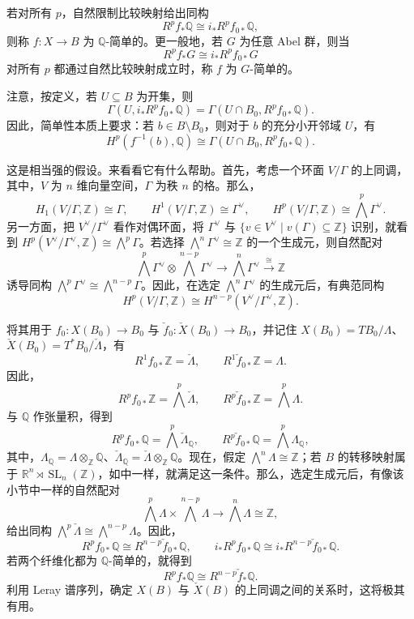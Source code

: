 \begin{definition}\label{def:6.101}
若对所有 $p$，自然限制比较映射给出同构
\[
R^pf_*\mathbb Q\cong i_*R^pf_{0*}\mathbb Q,
\]
则称 $f\colon X\to B$ 为 $\mathbb Q$-简单的。更一般地，若 $G$ 为任意 Abel 群，则当
\[
R^pf_*G\cong i_*R^pf_{0*}G
\]
对所有 $p$ 都通过自然比较映射成立时，称 $f$ 为 $G$-简单的。
\end{definition}

注意，按定义，若 $U\subseteq B$ 为开集，则
\[
\Gamma(U,i_*R^pf_{0*}\mathbb Q)
=\Gamma(U\cap B_0,R^pf_{0*}\mathbb Q).
\]
因此，简单性本质上要求：若 $b\in B\setminus B_0$，则对于 $b$ 的充分小开邻域 $U$，有
\[
H^p(f^{-1}(b),\mathbb Q)
\cong\Gamma(U\cap B_0,R^pf_{0*}\mathbb Q).
\]

这是相当强的假设。来看看它有什么帮助。首先，考虑一个环面 $V/\Gamma$ 的上同调，其中，$V$ 为 $n$ 维向量空间，$\Gamma$ 为秩 $n$ 的格。那么，
\[
H_1(V/\Gamma,\mathbb Z)\cong\Gamma,\qquad
H^1(V/\Gamma,\mathbb Z)\cong\Gamma^\vee,\qquad
H^p(V/\Gamma,\mathbb Z)\cong\bigwedge^p\Gamma^\vee.
\]
另一方面，把 $V^\vee/\Gamma^\vee$ 看作对偶环面，将 $\Gamma^\vee$ 与 $\{v\in V^\vee\mid v(\Gamma)\subseteq\mathbb Z\}$ 识别，就看到 $H^p(V^\vee/\Gamma^\vee,\mathbb Z)\cong\bigwedge^p\Gamma$。若选择 $\bigwedge^n\Gamma^\vee\cong\mathbb Z$ 的一个生成元，则自然配对
\[
\bigwedge^p\Gamma^\vee\otimes\bigwedge^{n-p}\Gamma^\vee
\longrightarrow\bigwedge^n\Gamma^\vee\xrightarrow{\ \cong\ }\mathbb Z
\]
诱导同构 $\bigwedge^p\Gamma^\vee\cong\bigwedge^{n-p}\Gamma$。因此，在选定 $\bigwedge^n\Gamma^\vee$ 的生成元后，有典范同构
\[
H^p(V/\Gamma,\mathbb Z)\cong H^{n-p}(V^\vee/\Gamma^\vee,\mathbb Z).
\]

将其用于 $f_0\colon X(B_0)\to B_0$ 与 $\check f_0\colon\check X(B_0)\to B_0$，并记住 $X(B_0)=TB_0/\Lambda$、$\check X(B_0)=T^*B_0/\check\Lambda$，有
\[
R^1f_{0*}\mathbb Z=\check\Lambda,\qquad R^1\check f_{0*}\mathbb Z=\Lambda.
\]
因此，
\[
R^pf_{0*}\mathbb Z=\bigwedge^p\check\Lambda,\qquad
R^p\check f_{0*}\mathbb Z=\bigwedge^p\Lambda.
\]
与 $\mathbb Q$ 作张量积，得到
\[
R^pf_{0*}\mathbb Q=\bigwedge^p\check\Lambda_{\mathbb Q},\qquad
R^p\check f_{0*}\mathbb Q=\bigwedge^p\Lambda_{\mathbb Q},
\]
其中，$\Lambda_{\mathbb Q}=\Lambda\otimes_{\mathbb Z}\mathbb Q$、$\check\Lambda_{\mathbb Q}=\check\Lambda\otimes_{\mathbb Z}\mathbb Q$。现在，假定 $\bigwedge^n\Lambda\cong\mathbb Z$；若 $B$ 的转移映射属于 $\mathbb R^n\rtimes\operatorname{SL}_n(\mathbb Z)$，如中一样，就满足这一条件。那么，选定生成元后，有像该小节中一样的自然配对
\[
\bigwedge^p\Lambda\times\bigwedge^{n-p}\Lambda
\longrightarrow\bigwedge^n\Lambda\cong\mathbb Z,
\]
给出同构 $\bigwedge^p\check\Lambda\cong\bigwedge^{n-p}\Lambda$。因此，
\[
R^pf_{0*}\mathbb Q\cong R^{n-p}\check f_{0*}\mathbb Q,
\qquad
i_*R^pf_{0*}\mathbb Q\cong i_*R^{n-p}\check f_{0*}\mathbb Q.
\]
若两个纤维化都为 $\mathbb Q$-简单的，就得到
\begin{equation}\label{eq:6.7}
R^pf_*\mathbb Q\cong R^{n-p}\check f_*\mathbb Q.
\end{equation}
利用 Leray 谱序列，确定 $X(B)$ 与 $\check X(B)$ 的上同调之间的关系时，这将极其有用。


